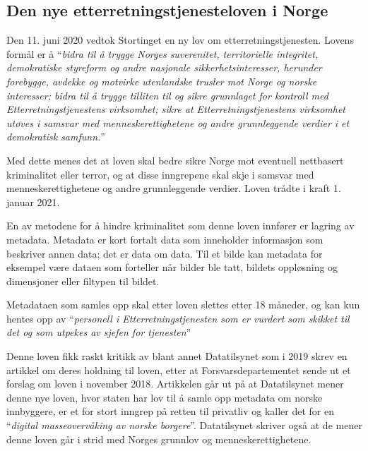 \subsection{Den nye etterretningstjenesteloven i Norge}
Den 11. juni 2020 vedtok Stortinget en ny lov om etterretningstjenesten. \parencite{artikkel:regjeringen_nylov}
Lovens formål er å ``\textit{bidra til å trygge Norges suverenitet, territorielle integritet, demokratiske styreform og andre nasjonale sikkerhetsinteresser, herunder forebygge, avdekke og motvirke utenlandske trusler mot Norge og norske interesser; bidra til å trygge tilliten til og sikre grunnlaget for kontroll med Etterretningstjenestens virksomhet; sikre at Etterretningstjenestens virksomhet utøves i samsvar med menneskerettighetene og andre grunnleggende verdier i et demokratisk samfunn.}'' \parencite[§1-1]{artikkel:lovdata_etterretningstjenesten} 
\newpage

Med dette menes det at loven skal bedre sikre Norge mot eventuell nettbasert kriminalitet eller terror, og at disse inngrepene skal skje i samsvar med menneskerettighetene og andre grunnleggende verdier. Loven trådte i kraft 1. januar 2021.

En av metodene for å hindre kriminalitet som denne loven innfører er lagring av metadata. \parencite[§7-7]{artikkel:lovdata_etterretningstjenesten} Metadata er kort fortalt data som inneholder informasjon som beskriver annen data; det er data om data. Til et bilde kan metadata for eksempel være dataen som forteller når bilder ble tatt, bildets oppløsning og dimensjoner eller filtypen til bildet. 

Metadataen som samles opp skal etter loven slettes etter 18 måneder, og kan kun hentes opp av ``\textit{personell i Etterretningstjenesten som er vurdert som skikket til det og som utpekes av sjefen for tjenesten}'' \parencite[§7-8]{artikkel:lovdata_etterretningstjenesten}

Denne loven fikk raskt kritikk av blant annet Datatilsynet som i 2019 skrev en artikkel om deres holdning til loven, etter at Forsvarsdepartementet sende ut et forslag om loven i november 2018. Artikkelen går ut på at Datatilsynet mener denne nye loven, hvor staten har lov til å samle opp metadata om norske innbyggere, er et for stort inngrep på retten til privatliv og kaller det for en ``\textit{digital masseovervåking av norske borgere}''. Datatilsynet skriver også at de mener denne loven går i strid med Norges grunnlov og menneskerettighetene. \parencite{artikkel:datatilsynet_etterretningstjenesten}

